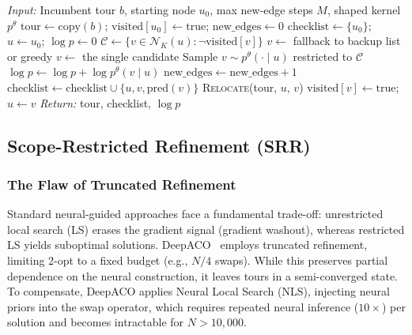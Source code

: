 \documentclass[sigconf,review]{acmart}
\begin{document}
\begin{algorithm}[h]
\caption{Perturbation-Based Ant Construction}
\label{alg:perturbation-app}
\begin{algorithmic}[1]
\STATE \emph{Input:} Incumbent tour $b$, starting node $u_0$, max new-edge steps $M$, shaped kernel $p^\theta$
\STATE $\text{tour} \leftarrow \text{copy}(b)$; $\text{visited}[u_0] \leftarrow \text{true}$; $\text{new\_edges} \leftarrow 0$
\STATE $\text{checklist} \leftarrow \{u_0\}$; $u \leftarrow u_0$; $\log p \leftarrow 0$
    \STATE $\mathcal{C} \leftarrow \{v \in \mathcal{N}_K(u) : \neg\text{visited}[v]\}$ 
        \STATE $v \leftarrow$ fallback to backup list or greedy
        \STATE $v \leftarrow$ the single candidate 
    \ELSE
        \STATE Sample $v \sim p^\theta(\cdot \mid u)$ restricted to $\mathcal{C}$
        \STATE $\log p \leftarrow \log p + \log p^\theta(v \mid u)$
    \ENDIF
     
        \STATE $\text{new\_edges} \leftarrow \text{new\_edges} + 1$
        \STATE $\text{checklist} \leftarrow \text{checklist} \cup \{u, v, \text{pred}(v)\}$
    \ENDIF
    \STATE \textsc{Relocate}(tour, $u$, $v$) 
    \STATE $\text{visited}[v] \leftarrow \text{true}$; $u \leftarrow v$
\ENDWHILE
\STATE \emph{Return:} tour, checklist, $\log p$
\end{algorithmic}
\end{algorithm}

\subsection{Scope-Restricted Refinement (SRR)}
\label{app:credit}

\subsubsection{The Flaw of Truncated Refinement}
Standard neural-guided approaches face a fundamental trade-off: unrestricted local search (LS) erases the gradient signal (gradient washout), whereas restricted LS yields suboptimal solutions.
DeepACO~\cite{deepaco} employs truncated refinement, limiting 2-opt to a fixed budget (e.g., $N/4$ swaps).
While this preserves partial dependence on the neural construction, it leaves tours in a semi-converged state.
To compensate, DeepACO applies Neural Local Search (NLS), injecting neural priors into the swap operator, which requires repeated neural inference ($10{\times}$) per solution and becomes intractable for $N > 10{,}000$.
\end{document}
